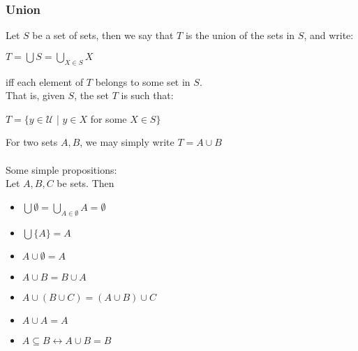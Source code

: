 \documentclass[a4paper]{article}
\begin{document}
\subsubsection{Union}
Let $S$ be a set of sets, then we say that $T$ is the union of the sets in $S$, and write:
\begin{center}
	$T = \bigcup S = \bigcup\limits_{X\in S}X$
\end{center}
iff each element of $T$ belongs to some set in $S$.\\
That is, given $S$, the set $T$ is such that:
\begin{center}
	$T = \{y\in \mathcal{U}$ | $y \in X$ for some $X \in S\}$
\end{center}
For two sets $A, B$, we may simply write $T = A \cup B$\\\\
Some simple propositions:\\
Let $A, B, C$ be sets. Then
\begin{itemize}
	\item $\bigcup \emptyset = \bigcup\limits_{A\in \emptyset} A = \emptyset$
	\item $\bigcup\{A\} = A$
	\item $A\cup \emptyset = A$
	\item $A\cup B = B\cup A$
	\item $A\cup (B\cup C) = (A\cup B) \cup C$
	\item $A\cup A = A$
	\item $A\subseteq B \leftrightarrow A\cup B = B$
\end{itemize}
\end{document}
